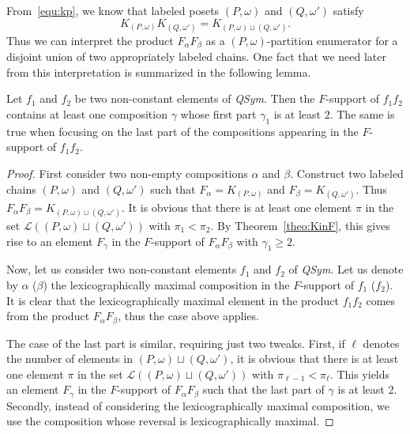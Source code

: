 \documentclass[ALCO,Unicode,published]{cedram}
\newcommand{\qsym}{{\it{QSym}}}
\newcommand{\om}{\omega}
\newcommand{\kpw}{K_{(P,\om)}}
\renewcommand{\L}{\mathcal{L}}
\begin{document}
From~\eqref{equ:kp}, we know that labeled posets $(P,\om)$ and $(Q,\om')$  satisfy 
\[
\kpw K_{(Q,\om')} = K_{(P,\om) \sqcup (Q,\om')}.
\]
Thus we can interpret the product $F_\alpha F_\beta$ as a $(P,\om)$-partition enumerator for a disjoint union of two appropriately labeled chains.  One fact that we need later from this interpretation is summarized in the following lemma.

\begin{lemma}\label{lem:deg2}
Let $f_1$ and $f_2$ be two non-constant elements of \qsym.
Then the $F$-support of $f_1 f_2$ contains at least one composition $\gamma$ whose first part $\gamma_1$ is at least $2$.
The same is true when focusing on the last part of the compositions appearing in the $F$-support of $f_1 f_2$.
\end{lemma}
\begin{proof}
First consider two non-empty compositions $\alpha$ and $\beta$.  Construct two labeled chains $(P,\om)$ and $(Q,\om')$ such that $F_\alpha=K_{(P,\om)}$ and $F_\beta=K_{(Q,\om')}$.  Thus $F_\alpha F_\beta = K_{(P,\om) \sqcup (Q,\om')}$.  It is obvious that there is at least one element $\pi$ in the set $\L((P,\om) \sqcup (Q,\om'))$ with $\pi_1<\pi_2$.  By Theorem~\ref{theo:KinF}, this gives rise to an element $F_\gamma$ in the $F$-support of $F_\alpha F_\beta$ with $\gamma_1\ge2$.

Now, let us consider two non-constant elements $f_1$ and $f_2$ of \qsym.
Let us denote by $\alpha$ (\resp $\beta$) the lexicographically maximal composition in the $F$-support of $f_1$ (\resp $f_2$).
It is clear that the lexicographically maximal element in the product $f_1 f_2$ comes from the product $F_\alpha F_\beta$,
thus the case above applies.

The case of the last part is similar, requiring just two tweaks.  First, if $\ell$ denotes the number of elements in $(P,\om) \sqcup (Q,\om')$, it is obvious that there is at least one element $\pi$ in the set $\L((P,\om) \sqcup (Q,\om'))$ with $\pi_{\ell-1}<\pi_\ell$.   This yields an element $F_\gamma$ in the $F$-support of $F_\alpha F_\beta$ such that the last part of $\gamma$ is at least 2. Secondly, instead of considering the lexicographically maximal composition, we use the composition whose reversal is lexicographically maximal.
\end{proof}
\end{document}
